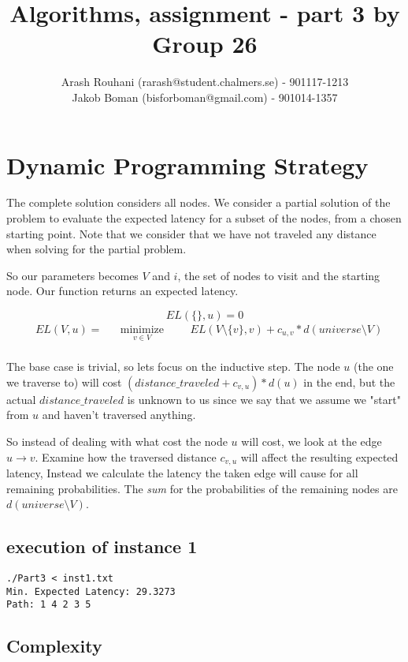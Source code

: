 \documentclass[a4paper,11pt]{article}
\title{Algorithms, assignment - part 3 by Group 26}
\author{Arash Rouhani (rarash@student.chalmers.se) - 901117-1213\\
        Jakob Boman (bisforboman@gmail.com) - 901014-1357}
\begin{document}
\maketitle

\section{Dynamic Programming Strategy}
The complete solution considers all nodes. We consider a partial solution
of the problem to evaluate the expected latency for a subset of the nodes,
from a chosen starting point. Note that we consider that we have not
traveled any distance when solving for the partial problem.

So our parameters becomes $V$ and $i$, the set of nodes to visit and the
starting node. Our function returns an expected latency.

$$ EL(\{\}, u) = 0 $$
\begin{equation*}
\begin{aligned}
& EL(V, u) =
& & \underset{v \in V}{\text{minimize}}
& & & EL(V\setminus \{v\}, v) + c_{u,v} * d(universe\setminus V) \\
\end{aligned}
\end{equation*}

The base case is trivial, so lets focus on the inductive step.
The node $u$ (the one we traverse to) will cost
$(distance\_traveled+c_{v,u})*d(u)$ in the end, but the actual
$distance\_traveled$ is unknown to us since we say that we assume
we "start" from $u$ and haven't traversed anything.

So instead of dealing with what cost the node $u$ will cost, we look at the
edge $u \to v$. Examine how the traversed distance $c_{v,u}$ will affect the
resulting expected latency, Instead we calculate the latency the taken edge will cause
for all remaining probabilities.
The \emph{sum} for the probabilities of the remaining nodes are
$d(universe\setminus V)$.

\subsection{execution of instance 1}

\begin{lstlisting}
./Part3 < inst1.txt
Min. Expected Latency: 29.3273
Path: 1 4 2 3 5
\end{lstlisting}

\subsection{Complexity}
\end{document}
